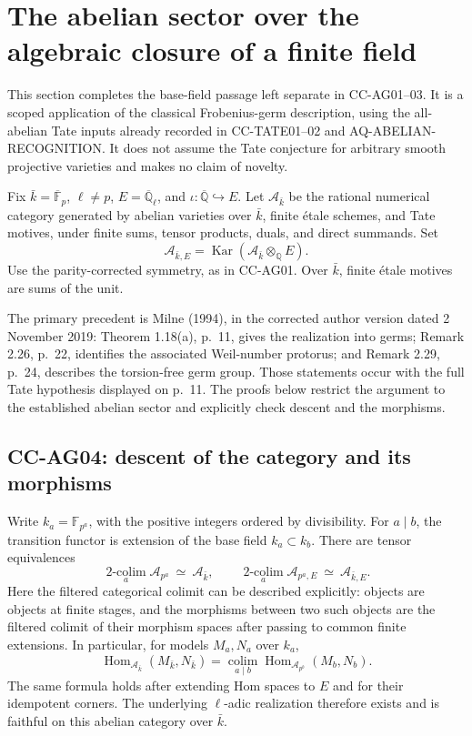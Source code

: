 \section{The abelian sector over the algebraic closure of a finite field}

This section completes the base-field passage left separate in
CC-AG01--03. It is a scoped application of the classical Frobenius-germ
description, using the all-abelian Tate inputs already recorded in
CC-TATE01--02 and AQ-ABELIAN-RECOGNITION. It does not assume the Tate
conjecture for arbitrary smooth projective varieties and makes no
claim of novelty.

Fix \(\bar k=\overline{\mathbb F}_p\), \(\ell\ne p\),
\(E=\overline{\mathbb Q}_\ell\), and
\(\iota:\overline{\mathbb Q}\hookrightarrow E\). Let
\(\mathcal A_{\bar k}\) be the rational numerical category generated by
abelian varieties over \(\bar k\), finite \'etale schemes, and Tate
motives, under finite sums, tensor products, duals, and direct summands.
Set
\[
 \mathcal A_{\bar k,E}
 =\operatorname{Kar}(\mathcal A_{\bar k}\otimes_{\mathbb Q}E).
\]
Use the parity-corrected symmetry, as in CC-AG01. Over \(\bar k\),
finite \'etale motives are sums of the unit.

The primary precedent is Milne (1994), in the corrected author version
dated 2 November 2019: Theorem 1.18(a), p.~11, gives the realization
into germs; Remark 2.26, p.~22, identifies the associated Weil-number
protorus; and Remark 2.29, p.~24, describes the torsion-free germ group.
Those statements occur with the full Tate hypothesis displayed on
p.~11. The proofs below restrict the argument to the established
abelian sector and explicitly check descent and the morphisms.

\subsection{CC-AG04: descent of the category and its morphisms}

Write \(k_a=\mathbb F_{p^a}\), with the positive integers ordered by
divisibility. For \(a\mid b\), the transition functor is extension of
the base field \(k_a\subset k_b\). There are tensor equivalences
\[
 \underset{a}{\operatorname{2-colim}}\mathcal A_{p^a}
 \ \simeq\ \mathcal A_{\bar k},
 \qquad
 \underset{a}{\operatorname{2-colim}}\mathcal A_{p^a,E}
 \ \simeq\ \mathcal A_{\bar k,E}.                 \tag{CC-AG.5}
\]
Here the filtered categorical colimit can be described explicitly:
objects are objects at finite stages, and the morphisms between two
such objects are the filtered colimit of their morphism spaces after
passing to common finite extensions. In particular, for models
\(M_a,N_a\) over \(k_a\),
\[
 \operatorname{Hom}_{\mathcal A_{\bar k}}(M_{\bar k},N_{\bar k})
 =
 \underset{a\mid b}{\operatorname{colim}}
 \operatorname{Hom}_{\mathcal A_{p^b}}(M_b,N_b).   \tag{CC-AG.6}
\]
The same formula holds after extending Hom spaces to \(E\) and for
their idempotent corners. The underlying \(\ell\)-adic realization
therefore exists and is faithful on this abelian category over
\(\bar k\).

